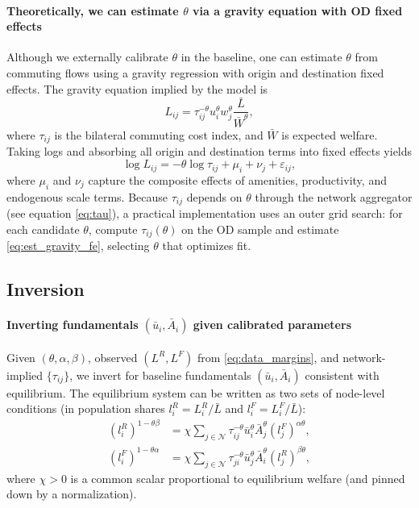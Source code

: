 \documentclass[12pt]{article}
\begin{document}
	\paragraph{Theoretically, we can estimate $\theta$ via a gravity equation with OD fixed effects}
	Although we externally calibrate $\theta$ in the baseline, one can estimate $\theta$ from commuting flows using a gravity regression with origin and destination fixed effects. The gravity equation implied by the model is
	\begin{equation}\label{eq:est_gravity}
		L_{ij}=\tau_{ij}^{-\theta}u_i^\theta w_j^\theta\frac{\bar L}{\bar W^\theta},
	\end{equation}
	where $\tau_{ij}$ is the bilateral commuting cost index, and $\bar W$ is expected welfare. Taking logs and absorbing all origin and destination terms into fixed effects yields
	\begin{equation}\label{eq:est_gravity_fe}
		\log L_{ij}=-\theta \log \tau_{ij}+\mu_i+\nu_j+\varepsilon_{ij},
	\end{equation}
	where $\mu_i$ and $\nu_j$ capture the composite effects of amenities, productivity, and endogenous scale terms. Because $\tau_{ij}$ depends on $\theta$ through the network aggregator (see equation \eqref{eq:tau}), a practical implementation uses an outer grid search: for each candidate $\theta$, compute $\tau_{ij}(\theta)$ on the OD sample and estimate \eqref{eq:est_gravity_fe}, selecting $\theta$ that optimizes fit.
	
	\subsection{Inversion}
	
	\paragraph{Inverting fundamentals $(\bar u_i,\bar A_i)$ given calibrated parameters}
	Given $(\theta,\alpha,\beta)$, observed $(L^R,L^F)$ from \eqref{eq:data_margins}, and network-implied $\{\tau_{ij}\}$, we invert for baseline fundamentals $(\bar u_i,\bar A_i)$ consistent with equilibrium. The equilibrium system can be written as two sets of node-level conditions (in population shares $l_i^R=L_i^R/\bar L$ and $l_i^F=L_i^F/\bar L$):
	\begin{align}
		(l_i^R)^{1-\theta\beta} &= \chi \sum_{j\in\mathcal N}\tau_{ij}^{-\theta}\bar u_i^\theta \bar A_j^\theta (l_j^F)^{\alpha\theta},\label{eq:invert_R}\\
		(l_i^F)^{1-\theta\alpha} &= \chi \sum_{j\in\mathcal N}\tau_{ji}^{-\theta}\bar u_j^\theta \bar A_i^\theta (l_j^R)^{\beta\theta},\label{eq:invert_F}
	\end{align}
	where $\chi>0$ is a common scalar proportional to equilibrium welfare (and pinned down by a normalization). 
	
\end{document}
